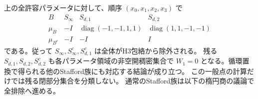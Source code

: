 \begin{theorem}[Stafford族の中山作用]
\label{thm:stafford-nakayama}
上の全許容パラメータに対して、順序 $(x_0,x_1,x_2,x_3)$ で
\[
\begin{array}{c|ccc}
 B&S_\infty&S_{d,1}&S_{d,2}\\\hline
 \mu_B&-I&\operatorname{diag}(-1,-1,1,1)&\operatorname{diag}(1,1,-1,-1)\\
 \mu_{B^c}&-I&-I&I
\end{array}
\]
である。従って $S_\infty,S_\infty^c,S_{d,1}^c$ は全体がH3包絡から除外される。
残る $S_{d,1},S_{d,2},S_{d,2}^c$ も各パラメータ領域の非空開稠密集合で
$W_1=0$ となる。循環置換で得られる他のStafford族にも対応する結論が成り立つ。
この一般点の計算だけでは残る閉部分集合を分類しない。
通常のStafford族は以下の楕円商の議論で全排除へ進める。
\end{theorem}
